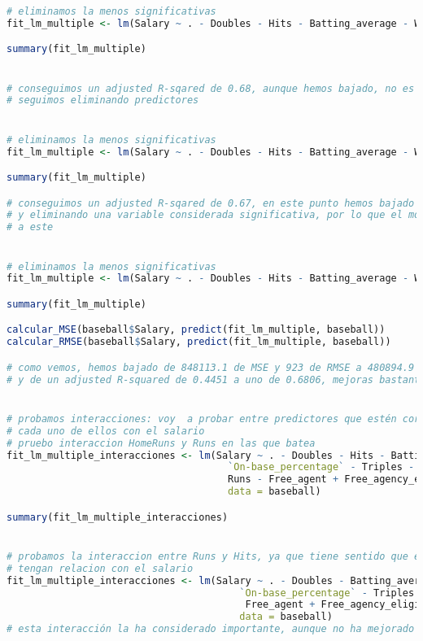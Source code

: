 \begin{lstlisting}[language=R]
# eliminamos la menos significativas
fit_lm_multiple <- lm(Salary ~ . - Doubles - Hits - Batting_average - Walks - `On-base_percentage` - Triples - Arbitration - Errors - Runs - Free_agent, data = baseball)

summary(fit_lm_multiple)


# conseguimos un adjusted R-sqared de 0.68, aunque hemos bajado, no es nada significativo
# seguimos eliminando predictores


# eliminamos la menos significativas
fit_lm_multiple <- lm(Salary ~ . - Doubles - Hits - Batting_average - Walks - `On-base_percentage` - Triples - Arbitration - Errors - Runs - Free_agent - HomeRuns, data = baseball)

summary(fit_lm_multiple)

# conseguimos un adjusted R-sqared de 0.67, en este punto hemos bajado un 1% de golpe,
# y eliminando una variable considerada significativa, por lo que el modelo final será el anterior
# a este


# eliminamos la menos significativas
fit_lm_multiple <- lm(Salary ~ . - Doubles - Hits - Batting_average - Walks - `On-base_percentage` - Triples - Arbitration - Errors - Runs - Free_agent, data = baseball)

summary(fit_lm_multiple)

calcular_MSE(baseball$Salary, predict(fit_lm_multiple, baseball))
calcular_RMSE(baseball$Salary, predict(fit_lm_multiple, baseball))

# como vemos, hemos bajado de 848113.1 de MSE y 923 de RMSE a 480894.9 y 695 respectivamente,
# y de un adjusted R-squared de 0.4451 a uno de 0.6806, mejoras bastante significativas


# probamos interacciones: voy  a probar entre predictores que estén correlados entre si, y
# cada uno de ellos con el salario
# pruebo interaccion HomeRuns y Runs en las que batea
fit_lm_multiple_interacciones <- lm(Salary ~ . - Doubles - Hits - Batting_average - Walks -
									  `On-base_percentage` - Triples - Arbitration - Errors -
									  Runs - Free_agent + Free_agency_eligibility*Runs_batted_in,
									  data = baseball)

summary(fit_lm_multiple_interacciones)


# probamos la interaccion entre Runs y Hits, ya que tiene sentido que estas dos
# tengan relacion con el salario
fit_lm_multiple_interacciones <- lm(Salary ~ . - Doubles - Batting_average - Walks -
										`On-base_percentage` - Triples - Arbitration - Errors -
										 Free_agent + Free_agency_eligibility*Runs_batted_in + Runs*Hits,
										data = baseball)
# esta interacción la ha considerado importante, aunque no ha mejorado mucho el R-squared



\end{lstlisting}
